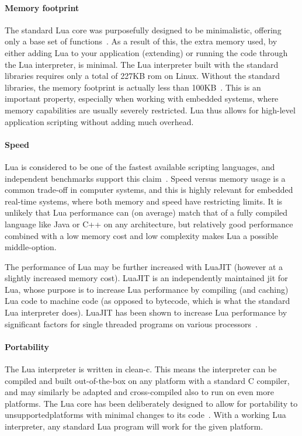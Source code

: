 \paragraph{Memory footprint}
The standard Lua core was purposefully designed to be minimalistic, offering only a base set of functions~\cite{article:the_implementation_of_lua}. As a result of this, the extra memory used, by either adding Lua to your application (extending) or running the code through the Lua interpreter, is minimal. The Lua interpreter built with the standard libraries requires only a total of 227KB \gls{rom} on Linux. Without the standard libraries, the memory footprint is actually less than 100KB~\cite{website:lua_about}. This is an important property, especially when working with embedded systems, where memory capabilities are usually severely restricted. Lua thus allows for high-level application scripting without adding much overhead.

\paragraph{Speed}
Lua is considered to be one of the fastest available scripting languages, and independent benchmarks support this claim~\cite{website:computer_language_benchmarks_game}. Speed versus memory usage is a common trade-off in computer systems, and this is highly relevant for embedded real-time systems, where both memory and speed have restricting limits. It is unlikely that Lua performance can (on average) match that of a fully compiled language like Java or C++ on any architecture, but relatively good performance combined with a low memory cost and low complexity makes Lua a possible middle-option.

The performance of Lua may be further increased with LuaJIT (however at a slightly increased memory cost). LuaJIT is an independently maintained \gls{jit} for Lua, whose purpose is to increase Lua performance by compiling (and caching) Lua code to machine code (as opposed to bytecode, which is what the standard Lua interpreter does). LuaJIT has been shown to increase Lua performance by significant factors for single threaded programs on various processors~\cite{website:luajit_performance}. 

\paragraph{Portability}
The Lua interpreter is written in \gls{clean-c}. This means the interpreter can be compiled and built out-of-the-box on any platform with a standard C compiler, and may similarly be adapted and cross-compiled also to run on even more platforms. The Lua core has been deliberately designed to allow for portability to \guillemotleft unsupported\guillemotright  platforms with minimal changes to its code~\cite{chapter:porting_lua_microcontroller}. With a working Lua interpreter, any standard Lua program will work for the given platform.

